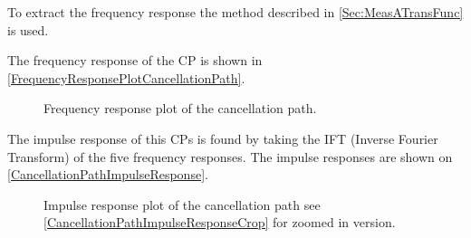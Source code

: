 To extract the frequency response the method described in \autoref{Sec:MeasATransFunc} is used.



The frequency response of the CP is shown in \autoref{FrequencyResponsePlotCancellationPath}.

\begin{figure}[H]
	\centering
	
	\caption{Frequency response plot of the cancellation path.}
	\label{FrequencyResponsePlotCancellationPath}
\end{figure}


The impulse response of this CPs is found by taking the IFT (Inverse Fourier Transform) of the five frequency responses. 
The impulse responses are shown on \autoref{CancellationPathImpulseResponse}.

\begin{figure}[H]
	\centering
	
	\caption{Impulse response plot of the cancellation path see \autoref{CancellationPathImpulseResponseCrop} for zoomed in version.}
	\label{CancellationPathImpulseResponse}
\end{figure}


